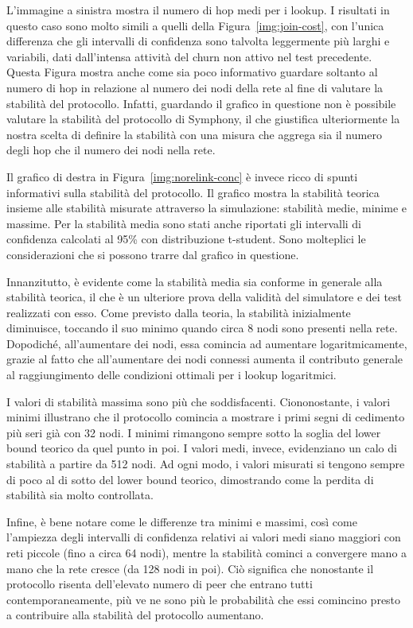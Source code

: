 \documentclass[prodmode,acmtap]{acmlarge}
\begin{document}
L'immagine a sinistra mostra il numero di hop medi per i lookup. I risultati in questo caso sono molto simili a quelli della Figura~\ref{img:join-cost}, con l'unica differenza che gli intervalli di confidenza sono talvolta leggermente più larghi e variabili, dati dall'intensa attività del churn non attivo nel test precedente. Questa Figura mostra anche come sia poco informativo guardare soltanto al numero di hop in relazione al numero dei nodi della rete al fine di valutare la stabilità del protocollo. Infatti, guardando il grafico in questione non è possibile valutare la stabilità del protocollo di Symphony, il che giustifica ulteriormente la nostra scelta di definire la stabilità con una misura che aggrega sia il numero degli hop che il numero dei nodi nella rete.

Il grafico di destra in Figura~\ref{img:norelink-conc} è invece ricco di spunti informativi sulla stabilità del protocollo. Il grafico mostra la stabilità teorica insieme alle stabilità misurate attraverso la simulazione: stabilità medie, minime e massime. Per la stabilità media sono stati anche riportati gli intervalli di confidenza calcolati al 95\% con distribuzione t-student. Sono molteplici le considerazioni che si possono trarre dal grafico in questione.

Innanzitutto, è evidente come la stabilità media sia conforme in generale alla stabilità teorica, il che è un ulteriore prova della validità del simulatore e dei test realizzati con esso. Come previsto dalla teoria, la stabilità inizialmente diminuisce, toccando il suo minimo quando circa 8 nodi sono presenti nella rete. Dopodiché, all'aumentare dei nodi, essa comincia ad aumentare logaritmicamente, grazie al fatto che all'aumentare dei nodi connessi aumenta il contributo generale al raggiungimento delle condizioni ottimali per i lookup logaritmici.

I valori di stabilità massima sono più che soddisfacenti. Ciononostante, i valori minimi illustrano che il protocollo comincia a mostrare i primi segni di cedimento più seri già con 32 nodi. I minimi rimangono sempre sotto la soglia del lower bound teorico da quel punto in poi. I valori medi, invece, evidenziano un calo di stabilità a partire da 512 nodi. Ad ogni modo, i valori misurati si tengono sempre di poco al di sotto del lower bound teorico, dimostrando come la perdita di stabilità sia molto controllata.

Infine, è bene notare come le differenze tra minimi e massimi, così come l'ampiezza degli intervalli di confidenza relativi ai valori medi siano maggiori con reti piccole (fino a circa 64 nodi), mentre la stabilità cominci a convergere mano a mano che la rete cresce (da 128 nodi in poi). Ciò significa che nonostante il protocollo risenta dell'elevato numero di peer che entrano tutti contemporaneamente, più ve ne sono più le probabilità che essi comincino presto a contribuire alla stabilità del protocollo aumentano.
\end{document}
